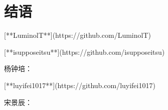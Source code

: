 \chapter{结语}

[**LuminolT**](https://github.com/LuminolT)

[**isupposeitsu**](https://github.com/isupposeitsu)

杨钟培：

[**luyifei1017**](https://github.com/luyifei1017)

宋景辰：